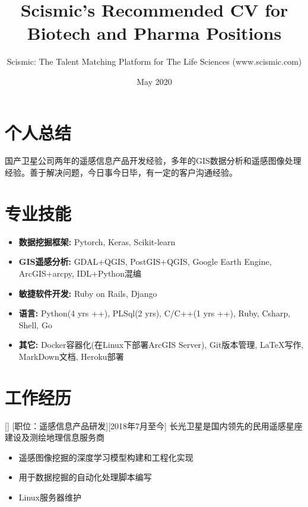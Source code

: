 \documentclass{{ctexart}}
\title{Scismic's Recommended CV for Biotech and Pharma Positions}
\author{Scismic: The Talent Matching Platform for The Life Sciences (www.scismic.com)}
\date{May 2020}
\begin{document}

\makecvtitle %

\section{个人总结}
国产卫星公司两年的遥感信息产品开发经验，多年的GIS数据分析和遥感图像处理经验。善于解决问题，今日事今日毕，有一定的客户沟通经验。 
 
\section{专业技能}

\begin{itemize}
\item \textbf{数据挖掘框架:} Pytorch, Keras, Scikit-learn
\item \textbf{GIS遥感分析:} GDAL+QGIS, PostGIS+QGIS, Google Earth Engine, ArcGIS+arcpy, IDL+Python混编
\item \textbf{敏捷软件开发:} Ruby on Rails, Django
\item \textbf{语言:} Python(4 yrs ++), PLSql(2 yrs), C/C++(1 yrs ++), Ruby, Csharp, Shell, Go
\item \textbf{其它:} Docker容器化(在Linux下部署ArcGIS Server), Git版本管理, LaTeX写作, MarkDown文档, Heroku部署
\end{itemize}
 
\section{工作经历}

[]
[职位：遥感信息产品研发][2018年7月至今]
长光卫星是国内领先的民用遥感星座建设及测绘地理信息服务商
\begin{itemize}
\item 遥感图像挖掘的深度学习模型构建和工程化实现
\item 用于数据挖掘的自动化处理脚本编写
\item Linux服务器维护
\end{itemize}
\end{document}
